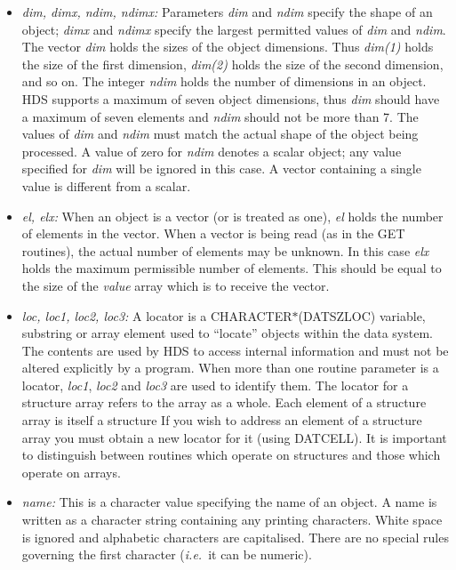 \documentclass[twoside,11pt]{article}
\newcommand{\htmlref}[2]{#1}
\renewcommand{\_}{\texttt{\symbol{95}}}
\newcommand{\qt}[1]{``#1''}
\newcommand{\st}[1]{{\em{#1}}}
\newcommand{\astar}[0]{{$*$}}
\newcommand{\qt}[1]{{\tt{"}}#1{\tt{"}}}
\newcommand{\astar}[0]{*}
\begin{document}
\begin{itemize}

\item \st{dim, dimx, ndim, ndimx:}
Parameters \st{dim} and \st{ndim} specify the \htmlref{shape}{sect:shape} of an object;
\st{dimx} and \st{ndimx} specify the largest permitted values of
\st{dim} and \st{ndim}. The vector \st{dim} holds the sizes of the
object dimensions. Thus \st{dim(1)} holds the size of the first
dimension, \st{dim(2)} holds the size of the second dimension, and so
on. The integer \st{ndim} holds the number of dimensions in an
object. HDS supports a maximum of seven object dimensions, thus
\st{dim} should have a maximum of seven elements and \st{ndim} should
not be more than 7. The values of \st{dim} and \st{ndim} must match
the actual shape of the object being processed. A value of zero for
\st{ndim} denotes a scalar object; any value specified for \st{dim}
will be ignored in this case. A vector containing a single value is
different from a scalar.

\item \st{el, elx:}
When an object is a vector (or is treated as one), \st{el} holds the
number of elements in the vector. When a vector is being read (as in
the GET routines), the actual number of elements may be unknown. In
this case \st{elx} holds the maximum permissible number of
elements. This should be equal to the size of the \st{value} array
which is to receive the vector.

\item \st{loc, loc1, loc2, loc3:}
A \htmlref{locator}{sect:locators} is a CHARACTER{\astar}(DAT\_\_SZLOC)
variable, substring or array element used to \qt{locate} objects
within the data system. The contents are used by HDS to access
internal information and must not be altered explicitly by a program.
When more than one routine parameter is a locator, \st{loc1},
\st{loc2} and \st{loc3} are used to identify them. The locator for a
structure array refers to the array as a whole. Each element of a
structure array is itself a structure If you wish to address an
element of a structure array you must obtain a new locator for it
(using \htmlref{DAT\_CELL}{DAT_CELL}). It is important to distinguish
between routines which operate on structures and those which operate
on arrays.

\item \htmlref{\st{name:}}{sect:name}
This is a character value specifying the name of an object. A name is
written as a character string containing any printing
characters. White space is ignored and alphabetic characters are
capitalised. There are no special rules governing the first character
(\st{i.e.}\ it can be numeric).


\end{itemize}
\end{document}
